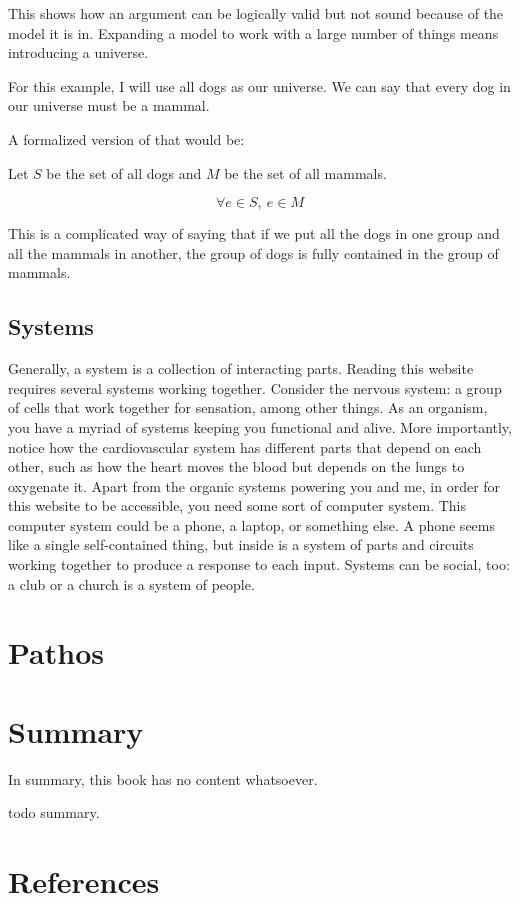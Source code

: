 \documentclass[
  letterpaper,
  DIV=11,
  numbers=noendperiod]{scrreprt}
\theoremstyle{remark}
\begin{document}
This shows how an argument can be logically valid but not sound because
of the model it is in. Expanding a model to work with a large number of
things means introducing a universe.

For this example, I will use all dogs as our universe. We can say that
every dog in our universe must be a mammal.

A formalized version of that would be:

Let \(S\) be the set of all dogs and \(M\) be the set of all mammals.

\[
\forall e \in S,\ e \in M
\]

This is a complicated way of saying that if we put all the dogs in one
group and all the mammals in another, the group of dogs is fully
contained in the group of mammals.

\section{Systems}\label{systems}

Generally, a system is a collection of interacting parts. Reading this
website requires several systems working together. Consider the nervous
system: a group of cells that work together for sensation, among other
things. As an organism, you have a myriad of systems keeping you
functional and alive. More importantly, notice how the cardiovascular
system has different parts that depend on each other, such as how the
heart moves the blood but depends on the lungs to oxygenate it. Apart
from the organic systems powering you and me, in order for this website
to be accessible, you need some sort of computer system. This computer
system could be a phone, a laptop, or something else. A phone seems like
a single self-contained thing, but inside is a system of parts and
circuits working together to produce a response to each input. Systems
can be social, too: a club or a church is a system of people.


\chapter{Pathos}\label{pathos}


\chapter{Summary}\label{summary}

In summary, this book has no content whatsoever.

todo summary.


\chapter*{References}\label{references}


\protect{}\label{refs}
\end{document}
